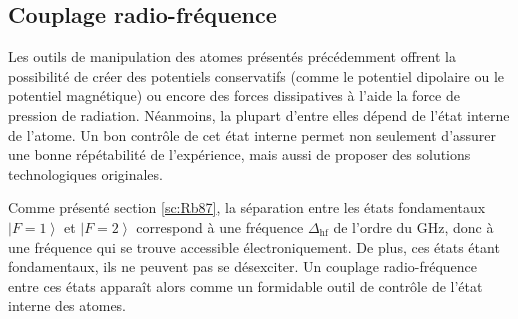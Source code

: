 \subsection{Couplage radio-fréquence} 
Les outils de manipulation des atomes présentés précédemment offrent la possibilité de créer des potentiels conservatifs (comme le potentiel dipolaire ou le potentiel magnétique) ou encore des forces dissipatives à l'aide la force de pression de radiation. Néanmoins, la plupart d'entre elles dépend de l'état interne de l'atome. Un bon contrôle de cet état interne permet non seulement d'assurer une bonne répétabilité de l'expérience, mais aussi de proposer des solutions technologiques originales. 

Comme présenté section \ref{sc:Rb87}, la séparation entre les états fondamentaux $\left| F=1 \right\rangle$ et $\left| F=2 \right\rangle$ correspond à une fréquence $\Delta_{\mathrm{hf}}$ de l'ordre du GHz, donc à une fréquence qui se trouve accessible électroniquement. De plus, ces états étant fondamentaux, ils ne peuvent pas se désexciter. Un couplage radio-fréquence entre ces états apparaît alors comme un formidable outil de contrôle de l'état interne des atomes.

